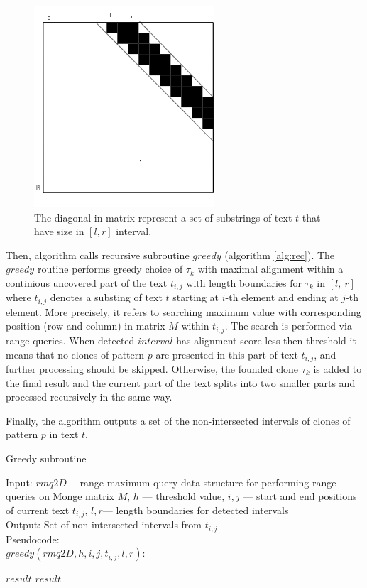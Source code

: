\begin{figure}[!t]
  \centering
    \includegraphics[width=0.4\columnwidth]{figures/M1.png}
    \caption{The diagonal in matrix represent a set of substrings of text $t$ that have size in $[l,r]$ interval.}\label{figures:M1}
\end{figure}

Then, algorithm calls recursive subroutine $greedy$ (algorithm \ref{alg:rec}).
The $greedy$ routine performs greedy choice of $\tau_{k}$ with maximal alignment within a continious uncovered part of the text $t_{i,j}$ with length boundaries for $\tau_{k}$ in $[l,\ r]$ where $t_{i,j}$ denotes a substing of text $t$ starting at $i$-th element and ending at $j$-th element.
More precisely, it refers to searching maximum value with corresponding position (row and column) in matrix $M$ within $t_{i,j}$.
The search is performed via range queries.
When detected $interval$ has alignment score less then threshold it means that no clones of pattern $p$ are presented in this part of text $t_{i,j}$, and further processing should be skipped.
Otherwise, the founded clone $\tau_k$ is added to the final result and the current part of the text splits into two smaller parts and processed recursively in the same way.

Finally, the algorithm outputs a set of the non-intersected intervals of clones of pattern $p$ in text $t$.


\begin{algorithm}[!t]
\caption{Greedy subroutine}
\label{alg:rec}
Input: $rmq2D$--- range maximum query data structure for performing range queries on Monge matrix $M$, $h$ --- threshold value, $i,j$ --- start and end positions of current text $t_{i,j}$, $l,r$--- length boundaries for detected intervals \\
Output: Set of non-intersected intervals from $t_{i,j}$\\
Pseudocode:\\
$greedy(rmq2D,h, i, j, t_{i,j},l,r ):$

\begin{algorithmic}[1]
\RETURN $result$
\ENDIF
{}
\ENDIF
{}
\ENDIF
\RETURN $result$
\end{algorithmic}
\end{algorithm}


